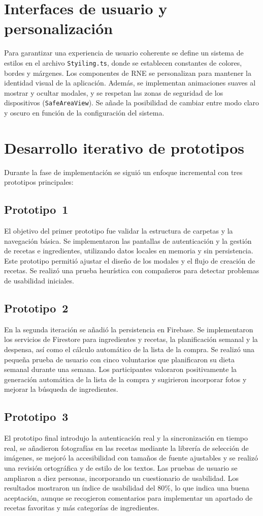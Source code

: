 \documentclass[twoside, openright, 11pt]{report}
\begin{document}
\section{Interfaces de usuario y personalización}
Para garantizar una experiencia de usuario coherente se define un sistema de estilos en el archivo \texttt{Styiling.ts}, donde se establecen constantes de colores, bordes y márgenes. Los componentes de RNE se personalizan para mantener la identidad visual de la aplicación. Además, se implementan animaciones suaves al mostrar y ocultar modales, y se respetan las zonas de seguridad de los dispositivos (\texttt{SafeAreaView}). Se añade la posibilidad de cambiar entre modo claro y oscuro en función de la configuración del sistema. 

\section{Desarrollo iterativo de prototipos}
\label{cap.prototipos}
Durante la fase de implementación se siguió un enfoque incremental con tres prototipos principales:

\subsection*{Prototipo 1}
El objetivo del primer prototipo fue validar la estructura de carpetas y la navegación básica. Se implementaron las pantallas de autenticación y la gestión de recetas e ingredientes, utilizando datos locales en memoria y sin persistencia. Este prototipo permitió ajustar el diseño de los modales y el flujo de creación de recetas. Se realizó una prueba heurística con compañeros para detectar problemas de usabilidad iniciales.

\subsection*{Prototipo 2}
En la segunda iteración se añadió la persistencia en Firebase. Se implementaron los servicios de Firestore para ingredientes y recetas, la planificación semanal y la despensa, así como el cálculo automático de la lista de la compra. Se realizó una pequeña prueba de usuario con cinco voluntarios que planificaron su dieta semanal durante una semana. Los participantes valoraron positivamente la generación automática de la lista de la compra y sugirieron incorporar fotos y mejorar la búsqueda de ingredientes.

\subsection*{Prototipo 3}
El prototipo final introdujo la autenticación real y la sincronización en tiempo real, se añadieron fotografías en las recetas mediante la librería de selección de imágenes, se mejoró la accesibilidad con tamaños de fuente ajustables y se realizó una revisión ortográfica y de estilo de los textos. Las pruebas de usuario se ampliaron a diez personas, incorporando un cuestionario de usabilidad. Los resultados mostraron un índice de usabilidad del 80\%, lo que indica una buena aceptación, aunque se recogieron comentarios para implementar un apartado de recetas favoritas y más categorías de ingredientes.
\end{document}
